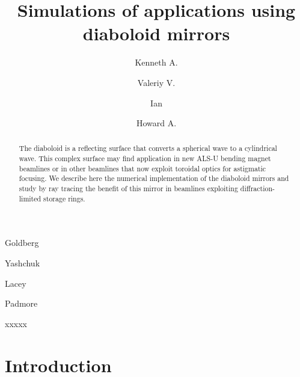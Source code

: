 \documentclass{iucr}              %
\begin{document}




\title{Simulations of applications using diaboloid mirrors}

\author[a]{Kenneth A.}{Goldberg}
\author[a]{Valeriy V.}{Yashchuk}
\author[a]{Ian}{Lacey}
\author[a]{Howard A.}{Padmore}




\begin{synopsis}
xxxxx
\end{synopsis}

\begin{abstract}
The diaboloid is a reflecting surface that converts a spherical wave to a cylindrical wave. This complex surface may find application in new ALS-U bending magnet beamlines or in other  beamlines that now exploit toroidal optics for astigmatic focusing. We describe here the numerical implementation of the diaboloid mirrors and study by ray tracing the benefit of this mirror in beamlines exploiting diffraction-limited storage rings.
\end{abstract}

\section{Introduction}
\end{document}
